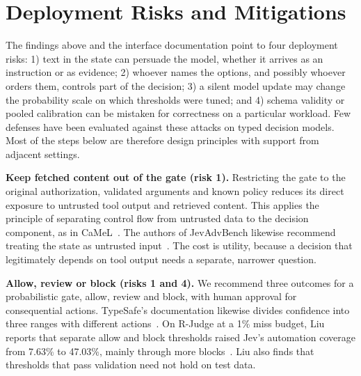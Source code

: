 \section{Deployment Risks and Mitigations}
\label{sec:risks}

The findings above and the interface documentation point to four deployment risks: 1) text in the state can persuade the model, whether it arrives as an instruction or as evidence; 2) whoever names the options, and possibly whoever orders them, controls part of the decision; 3) a silent model update may change the probability scale on which thresholds were tuned; and 4) schema validity or pooled calibration can be mistaken for correctness on a particular workload. Few defenses have been evaluated against these attacks on typed decision models.  Most of the steps below are therefore design principles with support from adjacent settings.

\noindent\textbf{Keep fetched content out of the gate (risk 1).} Restricting the gate to the original authorization, validated arguments and known policy reduces its direct exposure to untrusted tool output and retrieved content. This applies the principle of separating control flow from untrusted data to the decision component, as in CaMeL~\cite{debenedetti2025defeating}. The authors of JevAdvBench likewise recommend treating the state as untrusted input~\cite{hu2026jevadvbench}. The cost is utility, because a decision that legitimately depends on tool output needs a separate, narrower question.

\noindent\textbf{Allow, review or block (risks 1 and 4).} We recommend three outcomes for a probabilistic gate, allow, review and block, with human approval for consequential actions. TypeSafe's documentation likewise divides confidence into three ranges with different actions~\cite{typesafe2026docs}. On R-Judge at a 1\% miss budget, Liu reports that separate allow and block thresholds raised Jev's automation coverage from 7.63\% to 47.03\%, mainly through more blocks~\cite{liu2026evaluating}. Liu also finds that thresholds that pass validation need not hold on test data.

